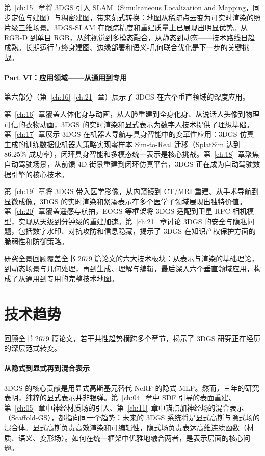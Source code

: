 第~\ref{ch:15}~章将 3DGS 引入 SLAM（Simultaneous Localization and Mapping，同步定位与建图）与稠密建图，带来范式转换：地图从稀疏点云变为可实时渲染的照片级三维场景。3DGS-SLAM 在跟踪精度和重建质量上已展现出明显优势。从 RGB-D 到单目 RGB，从纯视觉到多模态融合，从静态到动态——技术路线日趋成熟。长期运行与终身建图、边缘部署和语义-几何联合优化是下一步的关键挑战。

\paragraph{Part VI：应用领域——从通用到专用}
第六部分（第~\ref{ch:16}--\ref{ch:21}~章）展示了 3DGS 在六个垂直领域的深度应用。

第~\ref{ch:16}~章覆盖人体化身与动画，从人脸重建到全身化身、从说话人头像到物理可信的衣物动画，3DGS 的实时渲染和显式表示为数字人技术提供了理想基础。第~\ref{ch:17}~章展示 3DGS 在机器人导航与具身智能中的变革性应用：3DGS 仿真生成的训练数据使机器人策略实现零样本 Sim-to-Real 迁移（SplatSim 达到 86.25\% 成功率），闭环具身智能和多模态统一表示是核心挑战。第~\ref{ch:18}~章聚焦自动驾驶场景，从前馈 4D 街景重建到闭环仿真平台，3DGS 正在成为自动驾驶数据引擎的核心技术。

第~\ref{ch:19}~章将 3DGS 带入医学影像，从内窥镜到 CT/MRI 重建、从手术导航到显微成像，3DGS 的实时渲染和紧凑表示在多个医学子领域展现出独特价值。第~\ref{ch:20}~章覆盖遥感与航拍，EOGS 等框架将 3DGS 适配到卫星 RPC 相机模型，实现从天级到分钟级的重建加速。第~\ref{ch:21}~章讨论 3DGS 的安全与隐私问题，包括数字水印、对抗攻防和信息隐藏，揭示了 3DGS 在知识产权保护方面的脆弱性和防御策略。

\begin{takeaway}
研究全景回顾覆盖全书 2679 篇论文的六大技术板块：从表示与渲染的基础理论，到动态场景与几何处理，再到生成、理解与编辑，最后深入六个垂直领域应用，构成了从通用到专用的完整技术地图。
\end{takeaway}

\section{技术趋势}
\label{sec:22_2}

回顾全书 2679 篇论文，若干共性趋势横跨多个章节，揭示了 3DGS 研究正在经历的深层范式转变。

\paragraph{从隐式到显式再到混合表示}
3DGS 的核心贡献是用显式高斯基元替代 NeRF 的隐式 MLP。然而，三年的研究表明，纯粹的显式表示并非银弹。第~\ref{ch:04}~章中 SDF 引导的表面重建、第~\ref{ch:05}~章中神经材质场的引入、第~\ref{ch:11}~章中锚点加神经场的混合表示（Scaffold-GS），都指向同一个趋势：未来的 3DGS 系统将是显式高斯与隐式场的混合体。显式高斯负责高效渲染和可编辑性，隐式场负责表达高维连续函数（材质、语义、变形场）。如何在统一框架中优雅地融合两者，是表示层面的核心问题。

